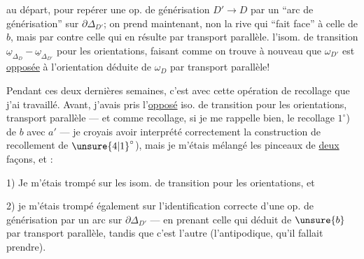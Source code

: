 au départ, pour repérer une op. de générisation $D'\longrightarrow D$ par un ``arc de  générisation'' sur $\partial\Delta_{D'}$; on prend maintenant, non la rive qui ``fait face'' à celle de $b$, mais par contre celle qui en résulte par transport parallèle.   l'isom. de transition $\underline\omega_{\Delta_D}\mathbin{-}\underline\omega_{\Delta_{D'}}$ pour les orientations, faisant comme 
on trouve à nouveau que $\omega_{D'}$ est \uline{opposée} à l'orientation  déduite de $\omega_D$ par transport parallèle!

Pendant ces deux dernières semaines, c'est avec cette opération de recollage que j'ai travaillé. Avant, j'avais pris  l'\uline{opposé} iso. de transition pour les orientations,  transport parallèle ---  et comme  recollage, si je me rappelle bien, le recollage
$1^\circ$) de $b$ avec $a'$ --- je croyais avoir interprété correctement la construction de recollement de $\unsure{4|1}^\circ$), mais je m'étais mélangé les pinceaux de \uline{deux} façons, et :

1) Je m'étais trompé sur les isom. de transition pour les orientations, et

2) je m'étais trompé également sur l'identification correcte d'une op. de générisation  par un arc sur $\partial\Delta_{D'}$ --- en prenant  celle qui   déduit de $\unsure{b}$ par transport parallèle, tandis que c'est l'autre  (l'antipodique, qu'il fallait prendre).

